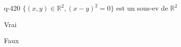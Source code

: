 \begin{truefalse}{q-420}
$\{ (x,y) \in \mathbb R^2, (x-y)^2=0\}$ est un sous-ev de $\mathbb R^2$
\item* Vrai
\item Faux
\end{truefalse}

